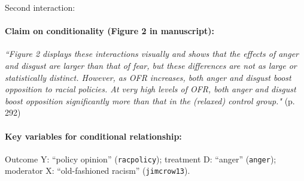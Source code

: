 \documentclass[12pt]{article}
\begin{document}
\noindent Second interaction:



\paragraph{Claim on conditionality (Figure
  2 in manuscript):} \emph{``Figure 2 displays these interactions visually and shows
that the effects of anger and disgust are larger than that
of fear, but these differences are not as large or statistically
distinct. However, as OFR increases, both anger
and disgust boost opposition to racial policies. At very
high levels of OFR, both anger and disgust boost opposition
significantly more than that in the (relaxed) control
group."} (p. 292)

\paragraph{Key variables for conditional relationship:} Outcome Y:
``policy opinion'' (\texttt{racpolicy}); treatment D: ``anger'' (\texttt{anger}); moderator X: ``old-fashioned racism'' (\texttt{jimcrow13}).

\clearpage
 
\end{document}
